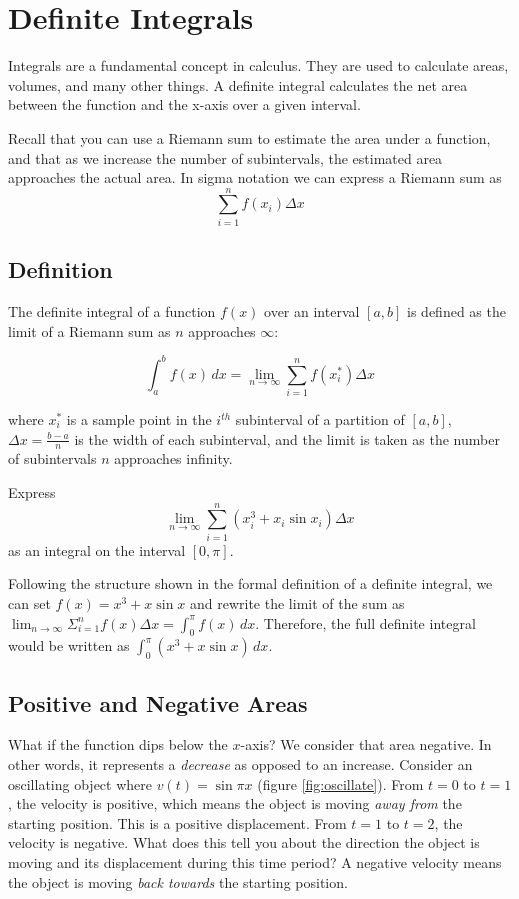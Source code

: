 \chapter{Definite Integrals}

Integrals are a fundamental concept in calculus. They are used to
calculate areas, volumes, and many other things. A definite integral
calculates the net area between the function and the x-axis over a
given interval.

Recall that you can use a Riemann sum to estimate the area under a 
function, and that as we increase the number of subintervals, the 
estimated area approaches the actual area. In sigma notation we can 
express a Riemann sum as $$\sum_{i=1}^{n} f(x_i)\Delta x$$

\section{Definition}

The definite integral of a function $f(x)$ over an interval $[a, b]$
is defined as the limit of a Riemann sum as $n$ approaches $\infty$:

\begin{equation}
\int_{a}^{b} f(x) \, dx = \lim_{{n \to \infty}} \sum_{i=1}^{n} 
f(x_i^*) \Delta x
\end{equation}

where $x_i^*$ is a sample point in the $i^{th}$ subinterval of a
partition of $[a, b]$, $\Delta x = \frac{b-a}{n}$ is the width of each
subinterval, and the limit is taken as the number of subintervals $n$
approaches infinity.

\begin{Exercise}[label=defint1]
Express $$\lim_{n \to \infty} \sum_{i=1}^{n} (x_i^3 + x_i\sin{x_i})
\Delta x$$ as an integral on the interval $[0, \pi]$. 
\end{Exercise}

\begin{Answer}[ref=defint1]
Following the structure shown in the formal definition of a definite 
integral, we can set $f(x) = x^3 + x\sin{x}$ and rewrite the limit of 
the sum as $\lim_{n \to \infty} \Sigma_{i=1}^{n} f(x)\Delta x = 
\int_{0}^{\pi} f(x)\,dx$. Therefore, the full definite integral 
would be written as $\int_{0}^{\pi} (x^3 + x\sin{x})\, dx$. 
\end{Answer}

\section{Positive and Negative Areas}
What if the function dips below the $x$-axis? We consider that area 
negative. In other words, it represents a \textit{decrease} as opposed to 
an increase. Consider an oscillating object where $v(t) = 
\sin{\pi x}$ (figure \ref{fig:oscillate}). From $t = 0$ to $t = 1$, 
the velocity is positive, which means the object is moving 
\textit{away from} the starting position. This is a positive 
displacement. From $t = 1$ to $t = 2$, the velocity is negative. What 
does this tell you about the direction the object is moving and its 
displacement during this time period? A negative velocity means the 
object is moving \textit{back towards} the starting position.

